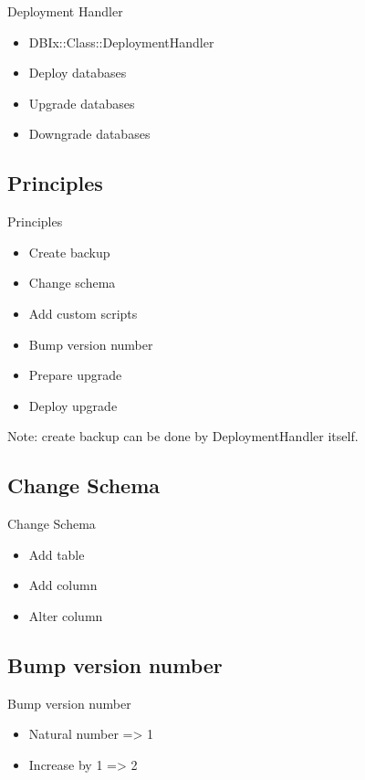 \begin{frame}{Deployment Handler}
\begin{itemize}
\item DBIx::Class::DeploymentHandler
\item Deploy databases
\item Upgrade databases
\item Downgrade databases
\end{itemize}
\end{frame}

\subsection{Principles}

\begin{frame}{Principles}
\begin{itemize}
\item Create backup
\item Change schema
\item Add custom scripts
\item Bump version number
\item Prepare upgrade
\item Deploy upgrade
\end{itemize}
\end{frame}

Note: create backup can be done by DeploymentHandler itself.

\subsection{Change Schema}

\begin{frame}{Change Schema}
\begin{itemize}
\item Add table
\item Add column
\item Alter column
\end{itemize}
\end{frame}

\subsection{Bump version number}
\begin{frame}{Bump version number}
\begin{itemize}
\item Natural number => 1
\item Increase by 1 => 2
\end{itemize}
\end{frame}

